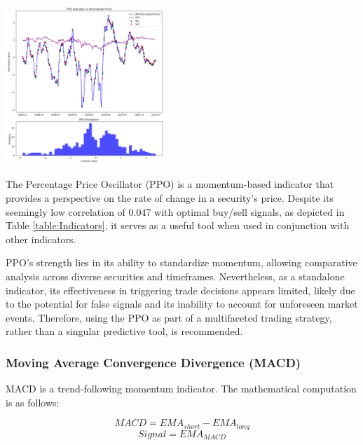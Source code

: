 \documentclass[
	letterpaper, %
]{jdf}
\begin{document}
\begin{jdffigure}
\includegraphics[height=6cm]{Figures/PPO_hist_and_price.png} \\
\label{fig:PPO}%
\end{jdffigure}

The Percentage Price Oscillator (PPO) is a momentum-based indicator that provides a perspective on the rate of change in a security's price. Despite its seemingly low correlation of 0.047 with optimal buy/sell signals, as depicted in Table \ref{table:Indicators}, it serves as a useful tool when used in conjunction with other indicators.

PPO's strength lies in its ability to standardize momentum, allowing comparative analysis across diverse securities and timeframes. Nevertheless, as a standalone indicator, its effectiveness in triggering trade decisions appears limited, likely due to the potential for false signals and its inability to account for unforeseen market events. Therefore, using the PPO as part of a multifaceted trading strategy, rather than a singular predictive tool, is recommended.
	
\subsubsection{Moving Average Convergence Divergence (MACD)}

MACD is a trend-following momentum indicator. The mathematical computation is as follows:

\[
MACD = EMA_{short} - EMA_{long}
\]
\[
Signal = EMA_{MACD}
\]
\end{document}
